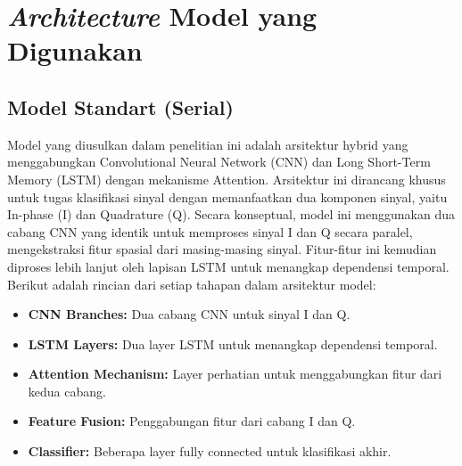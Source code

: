 \documentclass{article}
\begin{document}
\newpage 
\section{\textit{Architecture} Model yang Digunakan}
\subsection{Model Standart (Serial)}
Model yang diusulkan dalam penelitian ini adalah arsitektur hybrid yang menggabungkan Convolutional Neural Network (CNN) dan Long Short-Term Memory (LSTM) dengan mekanisme Attention. 
Arsitektur ini dirancang khusus untuk tugas klasifikasi sinyal dengan memanfaatkan dua komponen sinyal, yaitu In-phase (I) dan Quadrature (Q). 
Secara konseptual, model ini menggunakan dua cabang CNN yang identik untuk memproses sinyal I dan Q secara paralel, mengekstraksi fitur spasial dari masing-masing sinyal. 
Fitur-fitur ini kemudian diproses lebih lanjut oleh lapisan LSTM untuk menangkap dependensi temporal.
Berikut adalah rincian dari setiap tahapan dalam arsitektur model: 

\begin{itemize}
    \item \textbf{CNN Branches:} Dua cabang CNN untuk sinyal I dan Q.
    \item \textbf{LSTM Layers:} Dua layer LSTM untuk menangkap dependensi temporal.
    \item \textbf{Attention Mechanism:} Layer perhatian untuk menggabungkan fitur dari kedua cabang.
    \item \textbf{Feature Fusion:} Penggabungan fitur dari cabang I dan Q.
    \item \textbf{Classifier:} Beberapa layer fully connected untuk klasifikasi akhir.
\end{itemize}
\end{document}
